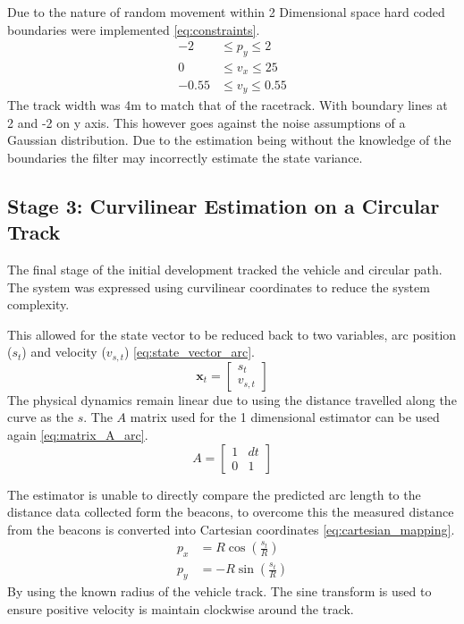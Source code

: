 \noindent Due to the nature of random movement within 2 Dimensional
space hard coded boundaries were implemented \eqref{eq:constraints}. 
\begin{equation} \label{eq:constraints}
    \begin{aligned}
        -2 &\le p_y \le 2 \\
        0 &\le v_x \le 25 \\
        -0.55 &\le v_y \le 0.55
    \end{aligned}
\end{equation}
The track width was 4m to match
that of the racetrack. With boundary lines at 2 and -2 on y axis. This however
goes against the noise assumptions of a Gaussian distribution. Due to the estimation
being without the knowledge of the boundaries the filter may incorrectly estimate
the state variance.

\subsection{Stage 3: Curvilinear Estimation on a Circular Track}
The final stage of the initial development tracked the
vehicle and circular path. The system was expressed using curvilinear coordinates
to reduce the system complexity.

\noindent This allowed for the state vector to be reduced back to two
variables, arc position ($s_t$) and velocity ($v_{s,t}$) \eqref{eq:state_vector_arc}. 
\begin{equation} \label{eq:state_vector_arc}
    \mathbf{x}_t = \begin{bmatrix} s_t \\ v_{s,t} \end{bmatrix}
\end{equation}
The physical dynamics remain linear due to using the distance travelled along the curve as the $s$. The $A$ matrix used for the 1 dimensional estimator can be used again \eqref{eq:matrix_A_arc}.
\begin{equation} \label{eq:matrix_A_arc}
    A = \begin{bmatrix} 1 & dt \\ 0 & 1 \end{bmatrix}
\end{equation}

\noindent The estimator is unable to directly compare the predicted
arc length to the distance data collected form the beacons, to overcome this the
measured distance from the beacons is converted into Cartesian coordinates \eqref{eq:cartesian_mapping}. 
\begin{equation} \label{eq:cartesian_mapping}
    \begin{aligned}
        p_x &= R \cos\left(\frac{s_t}{R}\right) \\
        p_y &= -R \sin\left(\frac{s_t}{R}\right)
    \end{aligned}
\end{equation}
By using the known radius of the vehicle track. The sine transform is used to ensure positive
velocity is maintain clockwise around the track.

